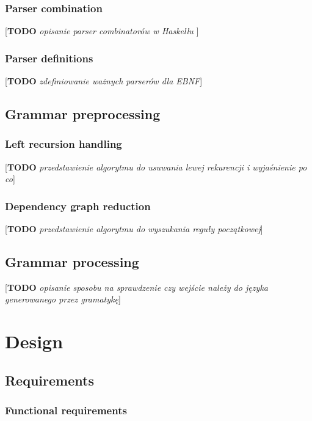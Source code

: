 \documentclass[english,engineering]{wizthesis}
\newcommand{\todo}[1]{{\color{red}[\textbf{TODO} \textit{#1}]}}
\begin{document}
\subsection{Parser combination}

\todo{opisanie parser combinatorów w Haskellu \cite{swierstra-2009}
\cite{leijen-2001} \cite{fokker-1995}}

\subsection{Parser definitions}

\todo{zdefiniowanie ważnych parserów dla EBNF}

\section{Grammar preprocessing}

\subsection{Left recursion handling}

\todo{przedstawienie algorytmu do usuwania lewej rekurencji i wyjaśnienie po co}

\subsection{Dependency graph reduction}

\todo{przedstawienie algorytmu do wyszukania reguły początkowej}

\section{Grammar processing}

\todo{opisanie sposobu na sprawdzenie czy wejście należy do języka generowanego
przez gramatykę}

\chapter{Design}

\section{Requirements}

\subsection{Functional requirements}
\end{document}

